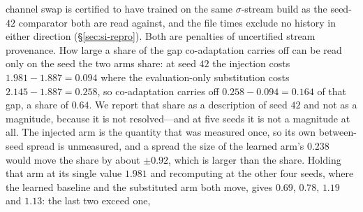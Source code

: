 channel swap is certified to have trained on the same $\sigma$-stream build as the seed-$42$
comparator both are read against, and the file times exclude no history in either direction
(\S\ref{sec:si-repro}). Both are penalties of uncertified stream provenance. How large a share of the gap co-adaptation carries off can
be read only on the seed the two arms share: at seed $42$ the injection costs $1.981-1.887=0.094$
where the evaluation-only substitution costs $2.145-1.887=0.258$, so co-adaptation carries off
$0.258-0.094=0.164$ of that gap, a share of $0.64$. We report that
share as a description of seed $42$ and not as a magnitude, because it is not resolved---and at five
seeds it is not a magnitude at all. The injected
arm is the quantity that was measured once, so its own between-seed spread is unmeasured, and a
spread the size of the learned arm's $0.238$ would move the share by about $\pm0.92$, which is
larger than the share. Holding that
arm at its single value $1.981$ and recomputing at the other four seeds, where the learned baseline
and the substituted arm both move, gives $0.69$, $0.78$, $1.19$ and $1.13$: the last two exceed one,
